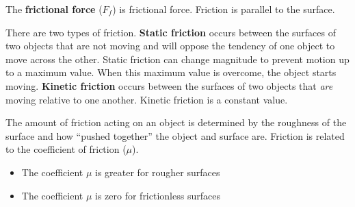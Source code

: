 \documentclass[dvipsnames]{article}
\begin{document}
The \textbf{\gls{frictional force}} ($F_f$) is \glsdesc{frictional force}. Friction is parallel to the surface.

\begin{center}
\end{center}

There are two types of friction. \textbf{Static friction} occurs between the surfaces of two objects that are not moving and will oppose the tendency of one object to move across the other. Static friction can change magnitude to prevent motion up to a maximum value. When this maximum value is overcome, the object starts moving. \textbf{Kinetic friction} occurs between the surfaces of two objects that \textit{are} moving relative to one another. Kinetic friction is a constant value.

\begin{center}
\end{center}

The amount of friction acting on an object is determined by the roughness of the surface and how ``pushed together'' the object and surface are. Friction is related to the coefficient of friction ($\mu$).

\begin{itemize}[topsep=0pt,itemsep=0pt]
    \item The coefficient $\mu$ is greater for rougher surfaces
    \item The coefficient $\mu$ is zero for frictionless surfaces
\end{itemize}
\end{document}
